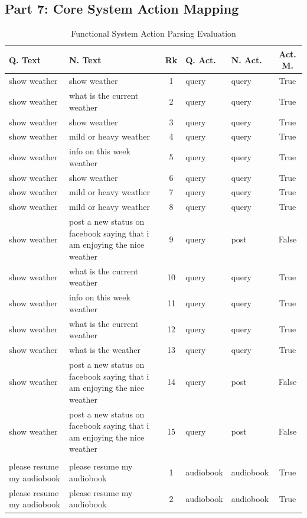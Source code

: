\subsection*{Part 7: Core System Action Mapping}
{\small
\begin{longtable}{p{4.0cm} p{4.0cm} c ll c}
\caption{Functional System Action Parsing Evaluation} \\
\toprule
\textbf{Q. Text} & \textbf{N. Text} & \textbf{Rk} & \textbf{Q. Act.} & \textbf{N. Act.} & \textbf{Act. M.} \\
\midrule
show weather & show weather & 1 & query & query & True \\
show weather & what is the current weather & 2 & query & query & True \\
show weather & show weather & 3 & query & query & True \\
show weather & mild or heavy weather & 4 & query & query & True \\
show weather & info on this week weather & 5 & query & query & True \\
show weather & show weather & 6 & query & query & True \\
show weather & mild or heavy weather & 7 & query & query & True \\
show weather & mild or heavy weather & 8 & query & query & True \\
show weather & post a new status on facebook saying that i am enjoying the nice weather & 9 & query & post & False \\
show weather & what is the current weather & 10 & query & query & True \\
show weather & info on this week weather & 11 & query & query & True \\
show weather & what is the current weather & 12 & query & query & True \\
show weather & what is the weather & 13 & query & query & True \\
show weather & post a new status on facebook saying that i am enjoying the nice weather & 14 & query & post & False \\
show weather & post a new status on facebook saying that i am enjoying the nice weather & 15 & query & post & False \\
\midrule
 &  &  &  &  & \\ %
\midrule
please resume my audiobook & please resume my audiobook & 1 & audiobook & audiobook & True \\
please resume my audiobook & please resume my audiobook & 2 & audiobook & audiobook & True \\

\end{longtable}}

